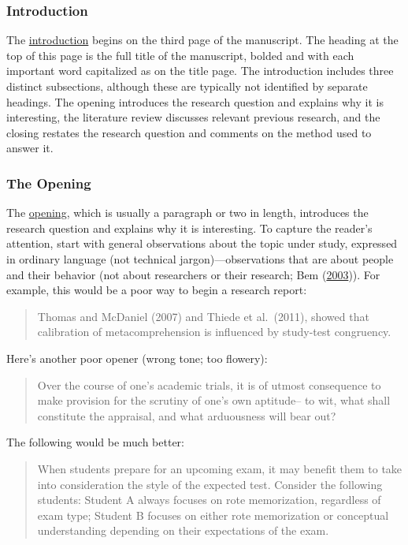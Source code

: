 \documentclass[
]{krantz}
\begin{document}
\hypertarget{introduction}{%
\subsubsection*{Introduction}\label{introduction}}


The \protect\hyperlink{introduction-1}{introduction} begins on the third page of the manuscript. The heading at the top of this page is the full title of the manuscript, bolded and with each important word capitalized as on the title page. The introduction includes three distinct subsections, although these are typically not identified by separate headings. The opening introduces the research question and explains why it is interesting, the literature review discusses relevant previous research, and the closing restates the research question and comments on the method used to answer it.

\hypertarget{the-opening}{%
\subsubsection*{The Opening}\label{the-opening}}


The \protect\hyperlink{opening}{opening}, which is usually a paragraph or two in length, introduces the research question and explains why it is interesting. To capture the reader's attention, start with general observations about the topic under study, expressed in ordinary language (not technical jargon)---observations that are about people and their behavior (not about researchers or their research; Bem (\protect\hyperlink{ref-bem2003writing}{2003})). For example, this would be a poor way to begin a research report:

\begin{quote}
Thomas and McDaniel (2007) and Thiede et al.~(2011), showed that calibration of metacomprehension is influenced by study-test congruency.
\end{quote}

Here's another poor opener (wrong tone; too flowery):

\begin{quote}
Over the course of one's academic trials, it is of utmost consequence to make provision for the scrutiny of one's own aptitude-- to wit, what shall constitute the appraisal, and what arduousness will bear out?
\end{quote}

The following would be much better:

\begin{quote}
When students prepare for an upcoming exam, it may benefit them to take into consideration the style of the expected test. Consider the following students: Student A always focuses on rote memorization, regardless of exam type; Student B focuses on either rote memorization or conceptual understanding depending on their expectations of the exam.
\end{quote}
\end{document}
